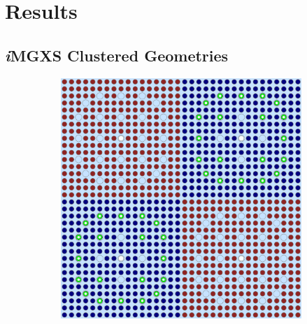 \documentclass[12pt,twoside]{mitthesis-exec}
\begin{document}
\section*{Results}

\subsection*{\textit{i}MGXS Clustered Geometries}

\begin{figure}[h!]
\centering
\begin{subfigure}{0.47\textwidth}
  \centering
  \includegraphics[width=0.95\linewidth]{figures/benchmarks/2x2}
  \caption{}
  \label{fig:reflector}
\end{subfigure}%
\begin{subfigure}{0.47\textwidth}
  \centering

\end{subfigure}
\end{figure}
\end{document}
